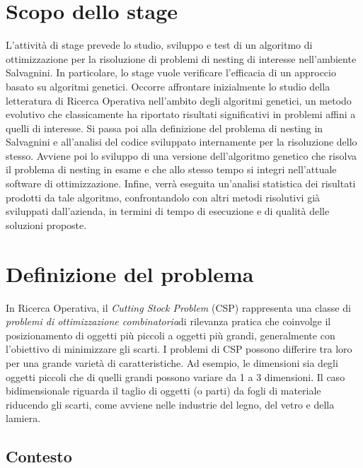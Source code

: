 \section{Scopo dello stage}

L’attività di stage prevede lo studio, sviluppo e test di un algoritmo di ottimizzazione per la risoluzione di problemi di nesting di interesse nell’ambiente Salvagnini. In particolare, lo stage vuole verificare l'efficacia di un approccio basato su algoritmi genetici.
Occorre affrontare inizialmente lo studio della letteratura di Ricerca Operativa nell’ambito degli algoritmi genetici, un metodo evolutivo che classicamente ha riportato risultati significativi in problemi affini a quelli di interesse. Si passa poi alla definizione del problema di nesting in Salvagnini e all’analisi del codice sviluppato internamente per la risoluzione dello stesso. Avviene poi lo sviluppo di una versione dell’algoritmo genetico che risolva il problema di nesting in esame e che allo stesso tempo si integri nell’attuale software di ottimizzazione. Infine, verrà eseguita un’analisi statistica dei risultati prodotti da tale algoritmo, confrontandolo con altri metodi risolutivi già sviluppati dall’azienda, in termini di tempo di esecuzione e di qualità delle soluzioni proposte.

\section{Definizione del problema}

In Ricerca Operativa, il \emph{Cutting Stock Problem} (CSP) rappresenta una classe di \emph{problemi di ottimizzazione combinatoria}\glsfirstoccur di rilevanza pratica che coinvolge il posizionamento di oggetti più piccoli a oggetti più grandi, generalmente con l'obiettivo di minimizzare gli scarti. I problemi di CSP possono differire tra loro per una grande varietà di caratteristiche. Ad esempio, le dimensioni sia degli oggetti piccoli che di quelli grandi possono variare da 1 a 3 dimensioni. Il caso bidimensionale riguarda il taglio di oggetti (o parti) da fogli di materiale riducendo gli scarti, come avviene nelle industrie del legno, del vetro e della lamiera.

\subsection{Contesto}

